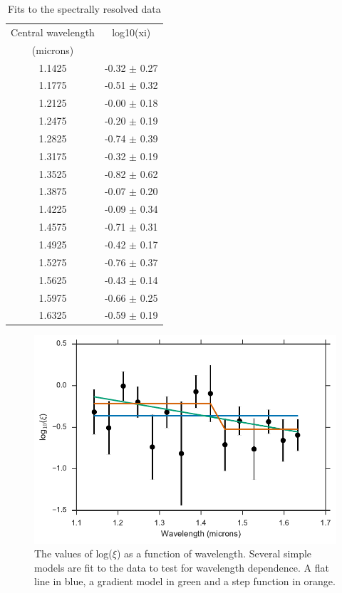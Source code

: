 \documentclass[a4paper,fleqn,usenatbib]{mnras}
\begin{document}
\begin{table}{
			\caption{Fits to the spectrally resolved data}
			\begin{center}
				\begin{tabular}{c c}
					\hline
					\hline
					Central wavelength &   log10(xi)  \\
					(microns) & \\
					\hline
1.1425 & -0.32 $\pm$ 0.27 \\
1.1775 & -0.51 $\pm$ 0.32 \\
1.2125 & -0.00 $\pm$ 0.18 \\
1.2475 & -0.20 $\pm$ 0.19 \\
1.2825 & -0.74 $\pm$ 0.39 \\
1.3175 & -0.32 $\pm$ 0.19 \\
1.3525 & -0.82 $\pm$ 0.62 \\
1.3875 & -0.07 $\pm$ 0.20 \\
1.4225 & -0.09 $\pm$ 0.34 \\
1.4575 & -0.71 $\pm$ 0.31 \\
1.4925 & -0.42 $\pm$ 0.17 \\
1.5275 & -0.76 $\pm$ 0.37 \\
1.5625 & -0.43 $\pm$ 0.14 \\
1.5975 & -0.66 $\pm$ 0.25 \\
1.6325 & -0.59 $\pm$ 0.19 \\
\end{tabular}
\end{center}
\label{tab:specresults}
}
\end{table}

\begin{figure}
	\begin{center}
		\includegraphics[width=\columnwidth]{img/all_models.pdf}
		\caption{The values of log($\xi$) as a function of wavelength. Several simple models are fit to the data to test for wavelength dependence. A flat line in blue, a gradient model in green and a step function in orange.}
		\label{fig:best_fit_flux}
	\end{center}
\end{figure}
\end{document}
